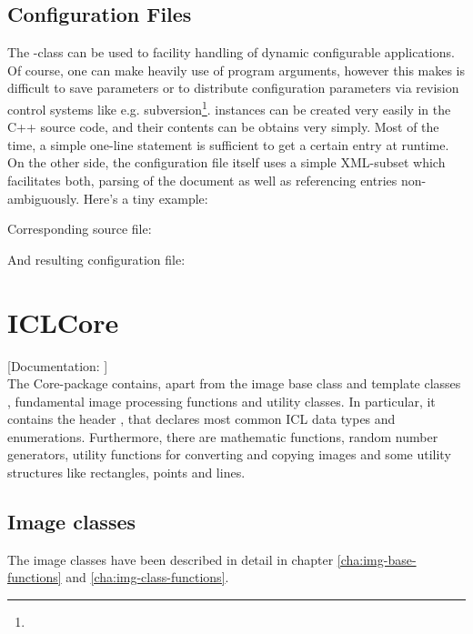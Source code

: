 \subsection{Configuration Files\label{subsec:config-file}}
The -class can be used to facility handling of dynamic configurable applications. Of course, one can make heavily use of program arguments, however this makes is difficult to save parameters or to distribute configuration parameters via revision control systems like e.g. subversion\footnote{}.  instances can be created very easily in the C++ source code, and their contents can be obtains very simply. Most of the time, a simple one-line statement is sufficient to get a certain entry at runtime. On the other side, the configuration file itself uses a simple XML-subset which facilitates both, parsing of the document as well as referencing entries non-ambiguously. Here's a tiny example:


Corresponding source file:


And resulting configuration file:



\section{ICLCore}

[Documentation: ]\\
The Core-package contains, apart from the image base class  and template classes , fundamental image processing functions and utility classes. In particular, it contains the header , that declares most common ICL data types and enumerations. Furthermore, there are mathematic functions, random number generators, utility functions for converting and copying images and some utility structures like rectangles, points and lines.

\subsection{Image classes}
The image classes have been described in detail in chapter \ref{cha:img-base-functions} and \ref{cha:img-class-functions}.


